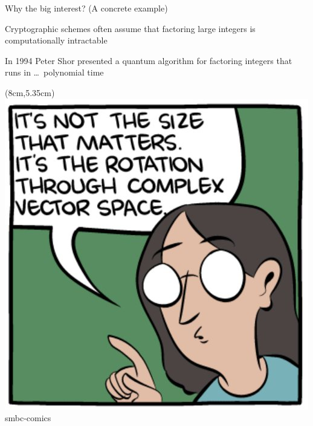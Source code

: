 \documentclass{beamer}
\begin{document}
\begin{frame}{Why the big interest? (A concrete example)}

  Cryptographic schemes often assume that factoring large integers is
  computationally intractable
  
  In 1994 Peter Shor presented a quantum \alert{algorithm} for factoring
  integers that runs in \dots\ \alert{polynomial time} 

  \vfill

  \begin{textblock*}{4cm}(8cm,5.35cm)
    \includegraphics[scale=0.2]{images/size.jpg}
    \tiny{smbc-comics}
  \end{textblock*}

\end{frame}
\end{document}
